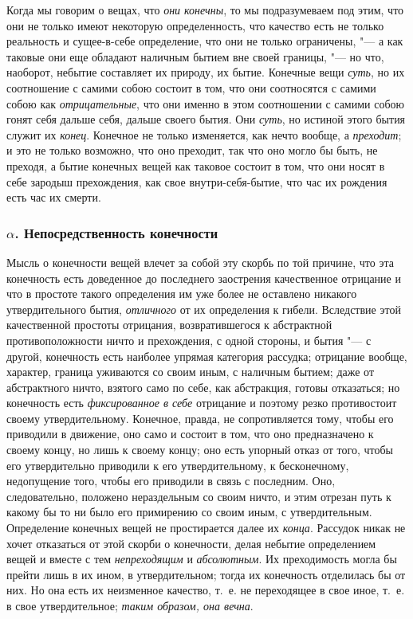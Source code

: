 Когда мы говорим о вещах, что {\em они конечны}, то мы
подразумеваем под этим, что они не только имеют некоторую определенность,
что качество есть не только реальность и сущее-в-себе определение, что они не
только ограничены, "--- а как таковые они еще обладают наличным бытием вне
своей границы, "--- но что, наоборот, небытие составляет их природу, их бытие.
Конечные вещи {\em суть}, но их соотношение с самими
собою состоит в том, что они соотносятся с самими собою как
{\em отрицательные}, что они именно в этом соотношении
с самими собою гонят себя дальше себя, дальше своего бытия. Они
{\em суть}, но истиной этого бытия служит их
{\em конец}. Конечное не только изменяется, как нечто
вообще, а {\em преходит}; и это не только возможно, что
оно преходит, так что оно могло бы быть, не преходя, а бытие конечных вещей
как таковое состоит в том, что они носят в себе зародыш прехождения, как
свое внутри-себя-бытие, что час их рождения есть час их смерти.

\subsubsection[$\alpha $. Непосредственность конечности]{$\alpha $. Непосредственность конечности}

Мысль о конечности вещей влечет за собой эту скорбь по той причине, что эта
конечность есть доведенное до последнего заострения качественное отрицание
и что в простоте такого определения им уже более не оставлено никакого
утвердительного бытия, {\em отличного} от их
определения к гибели. Вследствие этой качественной простоты отрицания,
возвратившегося к абстрактной противоположности ничто и прехождения, с
одной стороны, и бытия "--- с другой, конечность есть наиболее упрямая
категория рассудка; отрицание вообще, характер, граница уживаются со своим
иным, с наличным бытием; даже от абстрактного ничто, взятого само по
себе, как абстракция, готовы отказаться; но конечность есть
{\em фиксированное в себе} отрицание и поэтому резко
противостоит своему утвердительному. Конечное, правда, не сопротивляется
тому, чтобы его приводили в движение, оно само и состоит в том, что оно
предназначено к своему концу, но лишь к своему концу; оно есть упорный
отказ от того, чтобы его утвердительно приводили к его утвердительному, к
бесконечному, недопущение того, чтобы его приводили в связь с последним.
Оно, следовательно, положено нераздельным со своим ничто, и этим отрезан
путь к какому бы то ни было его примирению со своим иным, с
утвердительным. Определение конечных вещей не простирается далее их
{\em конца}. Рассудок никак не хочет отказаться от этой
скорби о конечности, делая небытие определением вещей и вместе с тем
{\em непреходящим} и
{\em абсолютным}. Их преходимость могла бы прейти лишь
в их ином, в утвердительном; тогда их конечность отделилась бы от них. Но
она есть их неизменное качество, т.~е. не переходящее в свое иное, т.~е.
в свое утвердительное; {\em таким образом, она вечна}.

